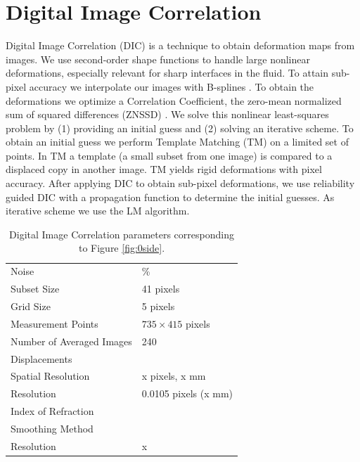\documentclass{svjour3}                     %
\begin{document}
\section{Digital Image Correlation}
\label{sec:DIC}
Digital Image Correlation (DIC) is a technique \cite{sutton2009image} to obtain deformation maps from images. We use second-order shape functions \cite{lu2000deformation} to handle large nonlinear deformations, especially relevant for sharp interfaces in the fluid. To attain sub-pixel accuracy we interpolate our images with B-splines \cite{thevenaz2000interpolation, unser1999splines}. To obtain the deformations we optimize a Correlation Coefficient, the zero-mean normalized sum of squared differences (ZNSSD) \cite{sutton2009image}. We solve this nonlinear least-squares problem by (1) providing an initial guess and (2) solving an iterative scheme. To obtain an initial guess we perform Template Matching (TM) \cite{lewis1995industrial,opencv_library} on a limited set of points. In TM a template (a small subset from one image) is compared to a displaced copy in another image. TM yields rigid deformations with pixel accuracy. After applying DIC to obtain sub-pixel deformations, we use reliability guided DIC \cite{chen2009quality, pan2012incremental} with a propagation function \cite{zhou2012propagation} to determine the initial guesses. As iterative scheme we use the LM algorithm. 


\begin{table}[htbp]
\caption{Digital Image Correlation parameters corresponding to Figure \ref{fig:0side}.}
\label{tab:esterrmagn}
\centering
\begin{tabular}{ll}
Noise & \% \\
Subset Size & 41 pixels \\
Grid Size 	& 5 pixels \\
Measurement Points & $735 \times 415$ pixels \\
Number of Averaged Images & 240 \\
Displacements & \\
\qquad Spatial Resolution & x pixels, x mm \\
\qquad Resolution & 0.0105 pixels (x mm) \\
Index of Refraction & \\
\qquad Smoothing Method & \\
\qquad Resolution & x \\
\end{tabular}
\end{table}
\end{document}
